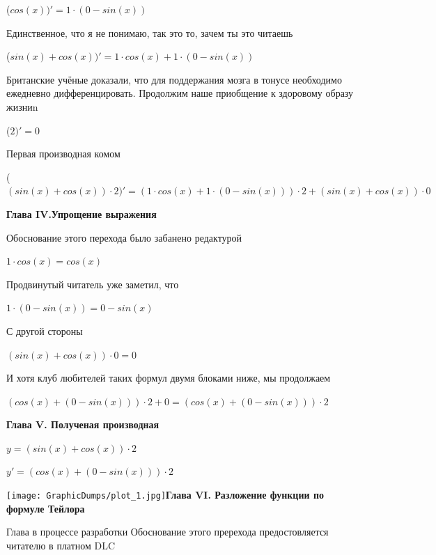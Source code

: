 \documentclass[12pt,a4paper,fleqn]{article}
\begin{document}
\begin{center}
 ($cos(x))'
  = 1 \cdot (0-sin(x))$\end{center}
Единственное, что я не понимаю, так это то, зачем ты это читаешь

\begin{center}
 ($sin(x)+cos(x))'
  = 1 \cdot cos(x)+1 \cdot (0-sin(x))$\end{center}
Британские учёные доказали, что для поддержания мозга в тонусе необходимо ежедневно дифференцировать. Продолжим наше приобщение к здоровому образу жизниn

\begin{center}
 ($2)'
  = 0$\end{center}
Первая производная комом\cite{link2}

\begin{center}
 ($(sin(x)+cos(x)) \cdot 2)'
  = (1 \cdot cos(x)+1 \cdot (0-sin(x))) \cdot 2+(sin(x)+cos(x)) \cdot 0$\end{center}
\newpage \textbf{\LARGE{Глава IV.Упрощение выражения}}

Обоснование этого перехода было забанено редактурой

\begin{center}
$1 \cdot cos(x) = cos(x)$\end{center}
Продвинутый читатель уже заметил, что

\begin{center}
$1 \cdot (0-sin(x)) = 0-sin(x)$\end{center}
С другой стороны

\begin{center}
$(sin(x)+cos(x)) \cdot 0 = 0$\end{center}
И хотя клуб любителей таких формул двумя блоками ниже, мы продолжаем

\begin{center}
$(cos(x)+(0-sin(x))) \cdot 2+0 = (cos(x)+(0-sin(x))) \cdot 2$\end{center}
\newpage \textbf{\LARGE{Глава V. Полученая производная}}

$y = $$(sin(x)+cos(x)) \cdot 2$

$y' = $$(cos(x)+(0-sin(x))) \cdot 2$

\texttt{[image: GraphicDumps/plot\_1.jpg]}\newpage \textbf{\LARGE{Глава VI. Разложение функции по формуле Тейлора}}

Глава в процессе разработки
Обоснование этого пререхода предостовляется читателю в платном DLC
\end{document}
